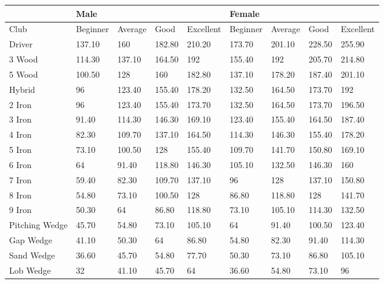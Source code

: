\documentclass[11pt,landscape]{article}
\begin{document}
\begin{table}[H]
    \centering
    \begin{tabular}{|l|l|l|l|l|l|l|l|l|}
        \hline
                   & Male     &         &        &           & Female   &         &        &           \\ \hline
    Club           & Beginner & Average & Good   & Excellent & Beginner & Average & Good   & Excellent \\ \hline
    Driver         & 137.10   & 160     & 182.80 & 210.20    & 173.70   & 201.10  & 228.50 & 255.90    \\ \hline
    3 Wood         & 114.30   & 137.10  & 164.50 & 192       & 155.40   & 192     & 205.70 & 214.80    \\ \hline
    5 Wood         & 100.50   & 128     & 160    & 182.80    & 137.10   & 178.20  & 187.40 & 201.10    \\ \hline
    Hybrid         & 96       & 123.40  & 155.40 & 178.20    & 132.50   & 164.50  & 173.70 & 192       \\ \hline
    2 Iron         & 96       & 123.40  & 155.40 & 173.70    & 132.50   & 164.50  & 173.70 & 196.50    \\ \hline
    3 Iron         & 91.40    & 114.30  & 146.30 & 169.10    & 123.40   & 155.40  & 164.50 & 187.40    \\ \hline
    4 Iron         & 82.30    & 109.70  & 137.10 & 164.50    & 114.30   & 146.30  & 155.40 & 178.20    \\ \hline
    5 Iron         & 73.10    & 100.50  & 128    & 155.40    & 109.70   & 141.70  & 150.80 & 169.10    \\ \hline
    6 Iron         & 64       & 91.40   & 118.80 & 146.30    & 105.10   & 132.50  & 146.30 & 160       \\ \hline
    7 Iron         & 59.40    & 82.30   & 109.70 & 137.10    & 96       & 128     & 137.10 & 150.80    \\ \hline
    8 Iron         & 54.80    & 73.10   & 100.50 & 128       & 86.80    & 118.80  & 128    & 141.70    \\ \hline
    9 Iron         & 50.30    & 64      & 86.80  & 118.80    & 73.10    & 105.10  & 114.30 & 132.50    \\ \hline
    Pitching Wedge & 45.70    & 54.80   & 73.10  & 105.10    & 64       & 91.40   & 100.50 & 123.40    \\ \hline
    Gap Wedge      & 41.10    & 50.30   & 64     & 86.80     & 54.80    & 82.30   & 91.40  & 114.30    \\ \hline
    Sand Wedge     & 36.60    & 45.70   & 54.80  & 77.70     & 50.30    & 73.10   & 86.80  & 105.10    \\ \hline
    Lob Wedge      & 32       & 41.10   & 45.70  & 64        & 36.60    & 54.80   & 73.10  & 96        \\ \hline
    \end{tabular}%
    \label{tab:guillermo_t1}
\end{table}
    
\end{document}
